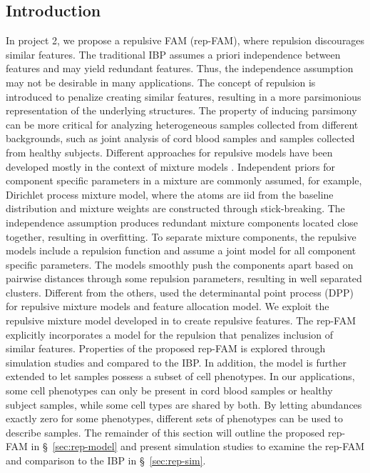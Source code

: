 \documentclass[12pt,]{article}
\begin{document}
\subsection{Introduction}
In project 2, we propose a repulsive FAM (rep-FAM), where repulsion discourages
similar features. The traditional IBP assumes a priori independence between
features and may yield redundant features. Thus, the independence assumption
may not be desirable in many applications.  The concept of repulsion is
introduced to penalize creating similar features, resulting in a more
parsimonious representation of the underlying structures.  The property of
inducing parsimony can be more critical for analyzing heterogeneous samples
collected from different backgrounds, such as joint analysis of cord blood
samples and samples collected from healthy subjects.  Different approaches for
repulsive models have been developed mostly in the context of mixture models
\citep{petralia2012repulsive, quinlan2017parsimonious, xie2017bayesian,
quinlan2017density}.  Independent priors for component specific parameters in a
mixture are commonly assumed, for example, Dirichlet process mixture model,
where the atoms are iid from the baseline distribution and mixture weights are
constructed through stick-breaking. The independence assumption produces
redundant mixture components located close together, resulting in overfitting.
To separate mixture components, the repulsive models include a repulsion
function and assume a joint model for all component specific parameters.  The
models smoothly push the components apart based on pairwise distances through
some repulsion parameters, resulting in well separated clusters.  Different
from the others, \cite{xu2016bayesian} used the determinantal point process
(DPP) for repulsive mixture models and feature allocation model.  We exploit
the repulsive mixture model developed in \cite{quinlan2017density} to create
repulsive features.  The rep-FAM explicitly incorporates a model for the
repulsion that penalizes inclusion of similar features. Properties of the
proposed rep-FAM is explored through simulation studies and compared to the
IBP.   In addition, the model is further extended to let samples possess a
subset of cell phenotypes. In our applications, some cell phenotypes can only
be present in cord blood samples or healthy subject samples, while some cell
types are shared by both.  By letting abundances exactly zero for some
phenotypes, different sets of phenotypes can be used to describe samples.  The
remainder of this section will outline the proposed rep-FAM in
\S~\ref{sec:rep-model} and present simulation studies to examine the rep-FAM
and comparison to the IBP in \S~\ref{sec:rep-sim}.
\end{document}
